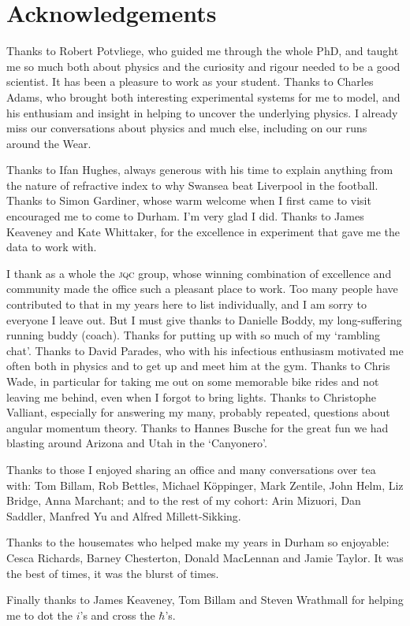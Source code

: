 \chapter*{Acknowledgements}

\begin{small} Thanks to Robert Potvliege, who guided me through the whole {PhD},
and taught me so much both about physics and the curiosity and rigour needed to
be a good scientist. It has been a pleasure to work as your student. Thanks to
Charles Adams, who brought both interesting experimental systems for me to
model, and his enthusiam and insight in helping to uncover the underlying
physics. I already miss our conversations about physics and much else, including
on our runs around the Wear.

Thanks to Ifan Hughes, always generous with his time to explain anything from
the nature of refractive index to why Swansea beat Liverpool in the football.
Thanks to Simon Gardiner, whose warm welcome when I first came to visit
encouraged me to come to Durham. I'm very glad I did. Thanks to James Keaveney
and Kate Whittaker, for the excellence in experiment that gave me the data to
work with.

I thank as a whole the \textsc{jqc} group, whose winning combination of
excellence and community made the office such a pleasant place to work. Too many
people have contributed to that in my years here to list individually, and I am
sorry to everyone I leave out. But I must give thanks to Danielle Boddy,
my long-suffering running buddy (\ie coach). Thanks for putting up with so much
of my `rambling chat'. Thanks to David Parades, who with his infectious
enthusiasm motivated me often both in physics and to get up and meet him at
the gym. Thanks to Chris Wade, in particular for taking me out on some memorable
bike rides and not leaving me behind, even when I forgot to bring lights. Thanks
to Christophe Valliant, especially for answering my many, probably repeated,
questions about angular momentum theory. Thanks to Hannes Busche for the
great fun we had blasting around Arizona and Utah in the `Canyonero'.

Thanks to those I enjoyed sharing an office and many conversations over tea
with: Tom Billam, Rob Bettles, Michael K\"{o}ppinger, Mark Zentile, John Helm,
Liz Bridge, Anna Marchant; and to the rest of my cohort: Arin Mizuori, Dan
Saddler, Manfred Yu and Alfred Millett-Sikking.

Thanks to the housemates who helped make my years in Durham so enjoyable: Cesca
Richards, Barney Chesterton, Donald MacLennan and Jamie Taylor. It was the best
of times, it was the blurst of times.

Finally thanks to James Keaveney, Tom Billam and Steven Wrathmall for helping me
to dot the $i$'s and cross the $\hbar$'s.
\end{small}
